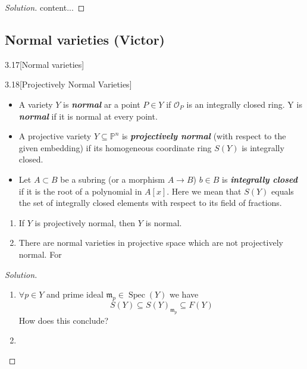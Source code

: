 \begin{proof}[Solution]
	content...
\end{proof}

\subsection{Normal varieties (Victor)}

\begin{manualexercise}{3.17}[Normal varieties]
	\end{manualexercise}

\begin{manualexercise}{3.18}[Projectively Normal Varieties]
\end{manualexercise}

	\begin{defn}\leavevmode 
		\begin{itemize}
		\item A variety $Y$ is \textit{\textbf{normal}} ar a point $P\in Y$ if $\mathcal{O}_{P}$ is an integrally closed ring. Y is \textit{\textbf{normal}} if it is normal at every point.
		\item A projective variety $Y\subseteq \mathbb{P}^n$ is \textit{\textbf{projectively normal}} (with respect to the given embedding) if its homogeneous coordinate ring $S(Y)$ is integrally closed.

		\item 	Let $A\subset B$ be a subring (or a morphism $A\to B$) $b\in B$ is \textit{\textbf{integrally closed}} if it is the root of a polynomial in $A[x]$. Here we mean that  $S(Y)$ equals the set of integrally closed elements with respect to its field of fractions.
\end{itemize}
	\end{defn}

	\begin{enumerate}[label=\alph*.]
		\item If $Y$ is projectively normal, then $Y$ is normal.

		\item There are normal varieties in projective space which are not projectively normal. For
	\end{enumerate}

\begin{proof}[Solution]\leavevmode
	\begin{enumerate}[label=\alph*.]
		\item $\forall p \in Y$ and prime ideal $\mathfrak{m}_p  \in\operatorname{Spec}(Y)$ we have
			\[S(Y)\subseteq S(Y)_{\mathfrak{m}_p}\subseteq F(Y)\]
			{\color{magenta}How does this conclude?}

		\item 
	\end{enumerate}
\end{proof}

